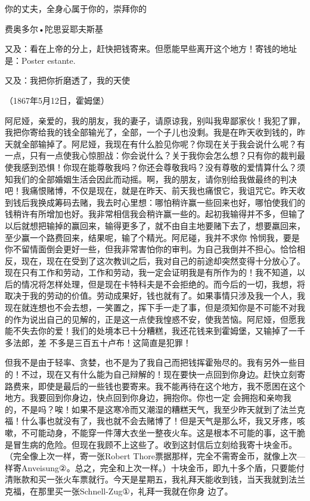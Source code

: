 \documentclass{article}
\begin{document}
你的丈夫，全身心属于你的，崇拜你的 


费奥多尔•陀思妥耶夫斯基 

又及：看在上帝的分上，赶快把钱寄来。但愿能早些离开这个地方！寄钱的地址是：Poster
estante. 

\newpage


又及：我把你折磨透了，我的天使 


（1867年5月12日，霍姆堡） 

阿尼娅，亲爱的，我的朋友，我的妻子，请原谅我，别叫我卑鄙家伙！我犯了罪，我把你寄给我的钱全部输光了，全部，一个子儿也没剩。我是在昨天收到钱的，昨天就全部输掉了。阿尼娅，我现在有什么脸见你呢？你现在关于我会说什么呢？有一点，只有一点使我心惊胆战：你会说什么？关于我你会怎么想？只有你的裁判最使我感到恐惧！你现在能尊敬我吗？你还会尊敬我吗？没有尊敬的爱情算什么？须知我们的全部婚姻生活会因此而动摇。啊，我的朋友，请你别给我做最终的判决吧！我痛恨赌博，不仅是现在，就是在昨天、前天我也痛恨它，我诅咒它。昨天收到钱后我换成筹码去赌，我去时心里想：哪怕稍许赢一些回来也好，哪怕使我们的钱稍许有所增加也好。我非常相信我会稍许赢一些的。起初我输得并不多，但输了以后就想把输掉的赢回来，输得更多了，就不由自主地要赌下去了，想要羸回来，至少赢一个路费回来，结果呢，输了个精光。阿尼碰，我并不求你
\newpage
怜悯我，要是你不留情面倒会更好一些，但我非常害怕你的审判。为自己我倒并不担心。恰恰相反，现在，现在在受到了这次教训之后，我对自己的前途却突然变得十分放心了。现在只有工作和劳动，工作和劳动，我一定会证明我是有所作为的！我不知道，以后的情况将怎样处理，但是现在卡特科夫是不会拒绝的。而今后的一切，我想，将取决于我的劳动的价值。劳动成果好，钱也就有了。如果事情只涉及我一个人，我现在就连想也不会去想，一笑置之，挥下手一走了事，但是须知你是不可能不对我的作为说出自己的见解的，正是这一点使我惶惑不安，使我苦恼。阿尼娅，但愿我能不失去你的爱！我们的处境本已十分糟糕，我还花钱来到霍姆堡，又输掉了一千多法郎，差
不多是三百五十卢布！这简直是犯罪！ 

但我不是由于轻率、贪婪，也不是为了我自己而把钱挥霍殆尽的。我有另外一些目的！不过，现在又有什么能为自己辩解的！现在要快一点回到你身边。赶快立刻寄路费来，即使是最后的一些钱也要寄来。我不能再待在这个地方，我不愿困在这个地方。我要回到你身边，快点回到你身边，拥抱你。你也一定
\newpage
会拥抱和亲吻我的，不是吗？唉！如果不是这寒冷而又潮湿的糟糕天气，我至少昨天就到了法兰克福！什么事也就没有了，我也就不会去赌博了！但是天气是那么坏，我又牙疼，咳嗽，不可能动身，不能穿一件薄大衣坐一整夜火车。这是根本不可能的事，这干脆是冒生病的危险。但现在我顾不上这些了。收到这封信后立刻给我寄十块金币。（完全像上次一样，寄一张Robert Thore票据那样，完全不需寄金币，就像上次—样寄Anveisung②。总之，完全和上次一样。）十块金币，即九十多个盾，只要能付清账款和买一张火车票就行。今天是星期五，我礼拜天能收到钱，当天我就到法兰克福，在那里买一张Schnell-Zug①，礼拜一我就在你身
边了。 
\end{document}
